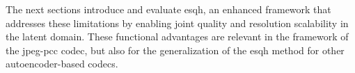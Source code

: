 The next sections introduce and evaluate \gls{esqh}, an enhanced framework that addresses these limitations by enabling joint quality and resolution scalability in the latent domain. These functional advantages are relevant in the framework of the \gls{jpeg-pcc} codec, but also for the generalization of the \gls{esqh} method for other autoencoder-based codecs.
